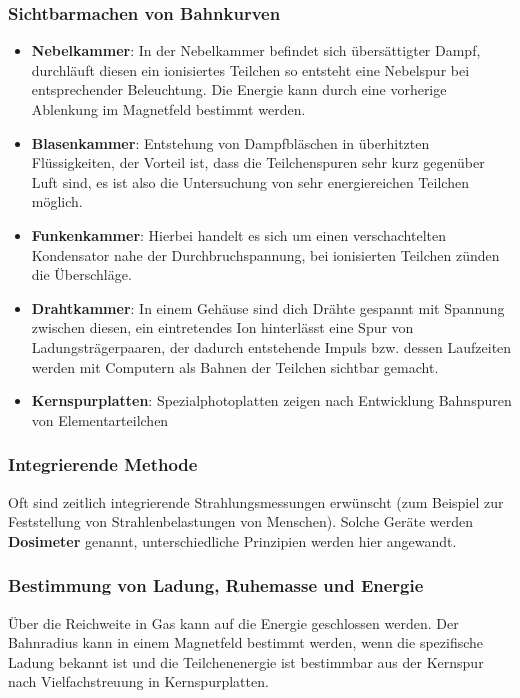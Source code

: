 \documentclass[12pt,a4paper,ngerman]{article}
\begin{document}
\subsubsection*{Sichtbarmachen von Bahnkurven}
\begin{itemize}
\item \textbf{Nebelkammer}: In der Nebelkammer befindet sich übersättigter Dampf, durchläuft diesen ein ionisiertes Teilchen so entsteht eine Nebelspur bei entsprechender Beleuchtung. Die Energie kann durch eine vorherige Ablenkung im Magnetfeld bestimmt werden. 
\item \textbf{Blasenkammer}: Entstehung von Dampfbläschen in überhitzten Flüssigkeiten, der Vorteil ist, dass die Teilchenspuren sehr kurz gegenüber Luft sind, es ist also die Untersuchung von sehr energiereichen Teilchen möglich.
\item \textbf{Funkenkammer}: Hierbei handelt es sich um einen verschachtelten Kondensator nahe der Durchbruchspannung, bei ionisierten Teilchen zünden die Überschläge. 
\item \textbf{Drahtkammer}: In einem Gehäuse sind dich Drähte gespannt mit Spannung zwischen diesen, ein eintretendes Ion hinterlässt eine Spur von Ladungsträgerpaaren, der dadurch entstehende Impuls bzw. dessen Laufzeiten werden mit Computern als Bahnen der Teilchen sichtbar gemacht. 
\item \textbf{Kernspurplatten}: Spezialphotoplatten zeigen nach Entwicklung Bahnspuren von Elementarteilchen
\end{itemize}

\pagebreak

\subsubsection*{Integrierende Methode}
Oft sind zeitlich integrierende Strahlungsmessungen erwünscht (zum Beispiel zur Feststellung von Strahlenbelastungen von Menschen). Solche Geräte werden \textbf{Dosimeter} genannt, unterschiedliche Prinzipien werden hier angewandt. 

\subsubsection*{Bestimmung von Ladung, Ruhemasse und Energie}
Über die Reichweite in Gas kann auf die Energie geschlossen werden. Der Bahnradius kann in einem Magnetfeld bestimmt werden, wenn die spezifische Ladung bekannt ist und die Teilchenenergie ist bestimmbar aus der Kernspur nach Vielfachstreuung in Kernspurplatten. 
\end{document}
